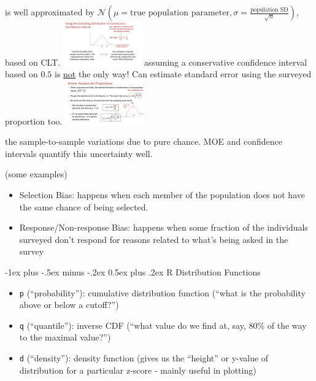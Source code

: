 \documentclass[10pt,landscape]{article}
\makeatletter
\renewcommand{\section}{\@startsection{section}{1}{0mm}%
                                {-1ex plus -.5ex minus -.2ex}%
                                {0.5ex plus .2ex}%
                                {\normalfont\large\bfseries}}
\newcommand{\Blue}[1]{\noindent{\textbf{\textcolor{Blue}{#1 -}}}}
\newcommand{\Red}[1]{\noindent{\textbf{\textcolor{BrickRed}{#1 -}}}}
\newcommand{\Hint}[1]{\noindent{\textcolor{Orange}{#1}}}
\makeatother
\begin{document}
\begin{multicols}{4}
\Red{Sampling Distribution} is well approximated by
$\mathcal{N}(\mu = \text{true population parameter}, \sigma = \frac{\text{population SD}}{\sqrt{n}})$, based on CLT.
\includegraphics[width=0.253\textwidth]{standard_error.jpg}
\Hint{Take away:} assuming a conservative confidence interval based on $0.5$ is \underline{not} the only way!
Can estimate standard error using the surveyed proportion too.
\includegraphics[width=0.253\textwidth]{proportions.jpg}

\Blue{Sampling Errors} the sample-to-sample variations due to pure chance. MOE and confidence intervals quantify this
uncertainty well.

\Blue{Non-Sampling Errors} (some examples)
\begin{itemize}
    \item Selection Bias: happens when each member of the population does not have the same chance of being selected.
    \item Response/Non-response Bias: happens when some fraction of the individuals surveyed don’t respond for reasons related to what’s being asked in the survey
\end{itemize}

\section{R Distribution Functions}
    
\begin{itemize}
    \item \texttt{p} (``probability''): cumulative distribution function (“what is the probability above or below a cutoff?”)
    \item \texttt{q} (``quantile''): inverse CDF (“what value do we find at, say, 80\% of the way to the maximal value?”)
    \item \texttt{d} (``density''): density function (gives us the “height” or y-value of distribution for a particular z-score - mainly useful in plotting)
\end{itemize}


\end{multicols}
\end{document}
